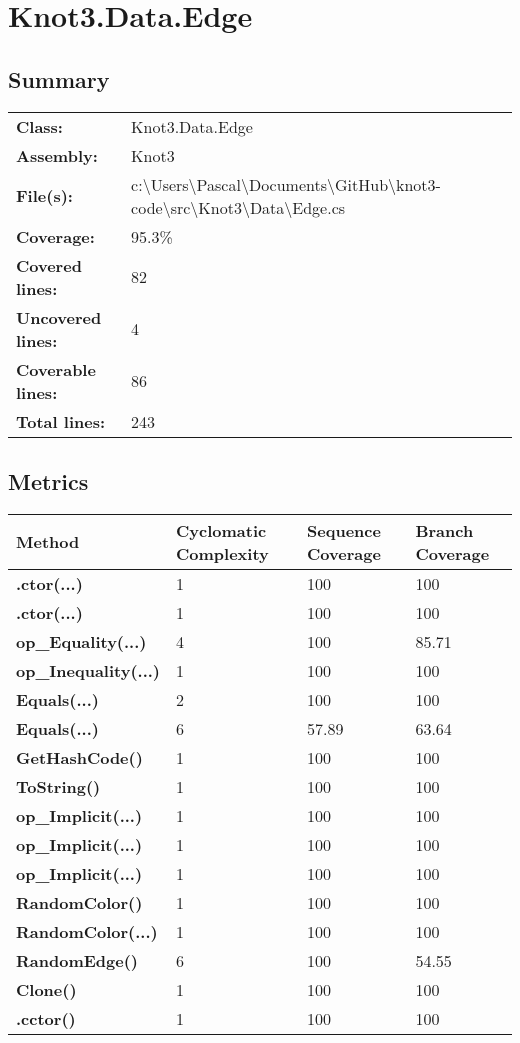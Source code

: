 \documentclass[a4paper,10pt]{article}
\begin{document}
\section{Knot3.Data.Edge}
\subsection{Summary}
\begin{longtable}[l]{ll}
\textbf{Class:} & Knot3.Data.Edge\\
\textbf{Assembly:} & Knot3\\
\textbf{File(s):} & \begin{minipage}[t]{12cm}{c:\textbackslash Users\textbackslash Pascal\textbackslash Documents\textbackslash GitHub\textbackslash knot3-code\textbackslash src\textbackslash Knot3\textbackslash Data\textbackslash Edge.cs}\end{minipage} \\
\textbf{Coverage:} & 95.3\%\\
\textbf{Covered lines:} & 82\\
\textbf{Uncovered lines:} & 4\\
\textbf{Coverable lines:} & 86\\
\textbf{Total lines:} & 243\\
\end{longtable}
\subsection{Metrics}
\begin{longtable}[l]{|l|l|l|l|}
\hline
\textbf{Method} & \textbf{Cyclomatic Complexity} & \textbf{Sequence Coverage} & \textbf{Branch Coverage}\\
\hline
\textbf{.ctor(...)} & 1 & 100 & 100\\
\hline
\textbf{.ctor(...)} & 1 & 100 & 100\\
\hline
\textbf{op\_Equality(...)} & 4 & 100 & 85.71\\
\hline
\textbf{op\_Inequality(...)} & 1 & 100 & 100\\
\hline
\textbf{Equals(...)} & 2 & 100 & 100\\
\hline
\textbf{Equals(...)} & 6 & 57.89 & 63.64\\
\hline
\textbf{GetHashCode()} & 1 & 100 & 100\\
\hline
\textbf{ToString()} & 1 & 100 & 100\\
\hline
\textbf{op\_Implicit(...)} & 1 & 100 & 100\\
\hline
\textbf{op\_Implicit(...)} & 1 & 100 & 100\\
\hline
\textbf{op\_Implicit(...)} & 1 & 100 & 100\\
\hline
\textbf{RandomColor()} & 1 & 100 & 100\\
\hline
\textbf{RandomColor(...)} & 1 & 100 & 100\\
\hline
\textbf{RandomEdge()} & 6 & 100 & 54.55\\
\hline
\textbf{Clone()} & 1 & 100 & 100\\
\hline
\textbf{.cctor()} & 1 & 100 & 100\\
\hline
\end{longtable}
\end{document}
